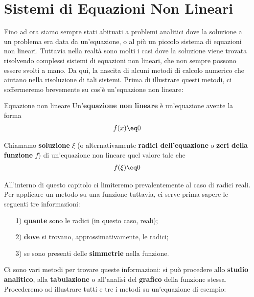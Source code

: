 \chapter{Sistemi di Equazioni Non Lineari}

Fino ad ora siamo sempre stati abituati a problemi analitici dove la soluzione a un problema era data da un'equazione, o al più un piccolo sistema di equazioni non lineari. Tuttavia nella realtà sono molti i casi dove la soluzione viene trovata risolvendo complessi sistemi di equazioni non lineari, che non sempre possono essere svolti a mano. Da qui, la nascita di alcuni metodi di calcolo numerico che aiutano nella risoluzione di tali sistemi. Prima di illustrare questi metodi, ci soffermeremo brevemente su cos'è un'equazione non lineare:

\begin{definition}{Equazione non lineare}
    Un'\textbf{equazione non lineare} è un'equazione avente la forma
    \[ f(x) \eq 0 \]

    Chiamamo \textbf{soluzione} $\xi$ (o alternativamente \textbf{radici dell'equazione} o \textbf{zeri della funzione} $f$) di un'equazione non lineare quel valore tale che
    \[ f(\xi) \eq 0 \]
\end{definition}

All'interno di questo capitolo ci limiteremo prevalentemente al caso di radici reali. Per applicare un metodo su una funzione tuttavia, ci serve prima sapere le seguenti tre informazioni:
\begin{itemize}
    \item [1)] \textbf{quante} sono le radici (in questo caso, reali);
    \item [2)] \textbf{dove} si trovano, approssimativamente, le radici;
    \item [3)] se sono presenti delle \textbf{simmetrie} nella funzione.
\end{itemize}

Ci sono vari metodi per trovare queste informazioni: si può procedere allo \textbf{studio analitico}, alla \textbf{tabulazione} o all'analisi del \textbf{grafico} della funzione stessa. Procederemo ad illustrare tutti e tre i metodi su un'equazione di esempio:

